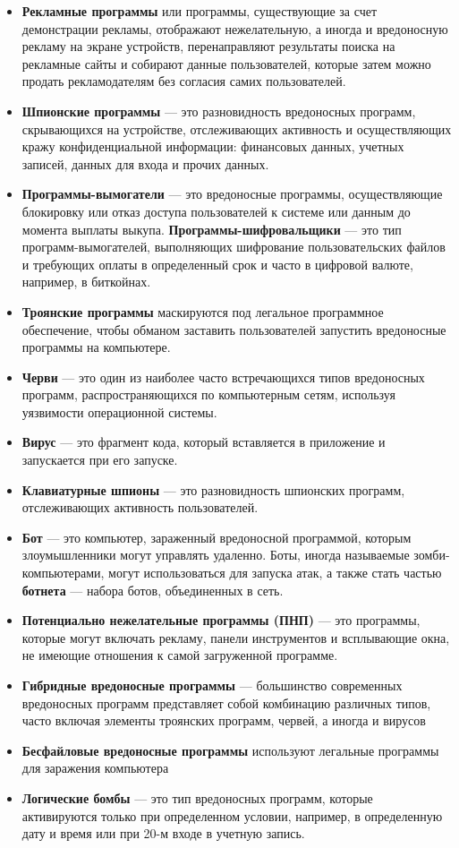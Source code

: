 \begin{itemize}
	\item \textbf{Рекламные программы} или программы,
		существующие за счет демонстрации рекламы, отображают нежелательную,
		а иногда и вредоносную рекламу на экране устройств,
		перенаправляют результаты поиска на рекламные сайты
		и собирают данные пользователей,
		которые затем можно продать рекламодателям
		без согласия самих пользователей.
	\item \textbf{Шпионские программы} --- это разновидность вредоносных
		программ, скрывающихся на устройстве, отслеживающих активность
		и осуществляющих кражу конфиденциальной информации:
		финансовых данных, учетных записей, данных для входа и прочих данных. 
	\item \textbf{Программы-вымогатели} --- это вредоносные программы,
		осуществляющие блокировку или отказ доступа пользователей
		к системе или данным до момента выплаты выкупа.
		\textbf{Программы-шифровальщики} --- это тип программ-вымогателей,
		выполняющих шифрование пользовательских файлов
		и требующих оплаты в определенный срок и часто в цифровой валюте,
		например, в биткойнах.
	\item \textbf{Троянские программы} маскируются
		под легальное программное обеспечение,
		чтобы обманом заставить пользователей запустить
		вредоносные программы на компьютере.
	\item \textbf{Черви} --- это один из наиболее часто встречающихся
		типов вредоносных программ, распространяющихся по компьютерным сетям,
		используя уязвимости операционной системы.
	\item \textbf{Вирус} --- это фрагмент кода,
		который вставляется в приложение и запускается при его запуске.
	\item \textbf{Клавиатурные шпионы} --- это разновидность шпионских
		программ, отслеживающих активность пользователей. 
	\item \textbf{Бот} --- это компьютер, зараженный вредоносной программой,
		которым злоумышленники могут управлять удаленно.
		Боты, иногда называемые зомби-компьютерами,
		могут использоваться для запуска атак,
		а также стать частью \textbf{ботнета} --- набора ботов,
		объединенных в сеть.
	\item \textbf{Потенциально нежелательные программы (ПНП)}
		--- это программы, которые могут включать рекламу, панели инструментов
		и всплывающие окна, не имеющие отношения к самой загруженной программе.
	\item \textbf{Гибридные вредоносные программы} ---
		большинство современных вредоносных программ представляет
		собой комбинацию различных типов,
		часто включая элементы троянских программ, червей, а иногда и вирусов
	\item \textbf{Бесфайловые вредоносные программы} используют
		легальные программы для заражения компьютера
	\item \textbf{Логические бомбы} --- это тип вредоносных программ,
		которые активируются только при определенном условии,
		например, в определенную дату и время
		или при 20-м входе в учетную запись.
\end{itemize}

